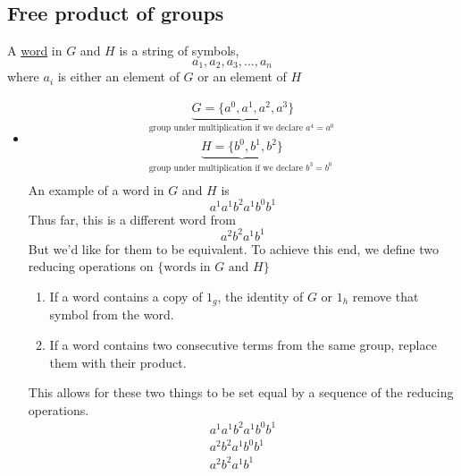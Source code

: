 \documentclass[../notes.tex]{subfiles}
\begin{document}
        \subsection{Free product of groups}
        \begin{definition}
            A \underline{word} in $G$ and $H$ is a string of symbols,
            \[
                a_1,a_2,a_3,\dots,a_n
            \]
            where $a_i$ is either an element of $G$ or an element of $H$
        \end{definition}
        \begin{itemize}
            \item
                \begin{align*}
                    \underbrace{G = \{a^0,a^1,a^2,a^3\}}_{\text{
                            group under multiplication if we declare $a^4=a^0$
                        }
                    }\\
                    \underbrace{H = \{b^0,b^1,b^2\}}_{\text{
                            group under multiplication if we declare $b^3=b^0$
                        }
                    }\\
                \end{align*}
                An example of a word in $G$ and $H$ is 
                \[
                    a^1a^1b^2a^1b^0b^1
                \]
                Thus far, this is a different word from
                \[
                    a^2b^2a^1b^1
                \]
                But we'd like for them to be equivalent. To achieve
                this end, we define two reducing operations on 
                $\{\text{words in $G$ and $H$}\}$
                \begin{enumerate}
                    \item If a word contains a copy of $1_g$, the identity
                        of $G$ or $1_h$ remove that symbol from the word.
                    \item If a word contains two consecutive terms
                        from the same group, replace them with their product.
                \end{enumerate}
                This allows for these two things to be set equal by a sequence
                of the reducing operations.
                \begin{align*}
                    a^1a^1b^2a^1b^0b^1\\
                    a^2b^2a^1b^0b^1\\
                    a^2b^2a^1b^1\\
                \end{align*}
        \end{itemize}
\end{document}

